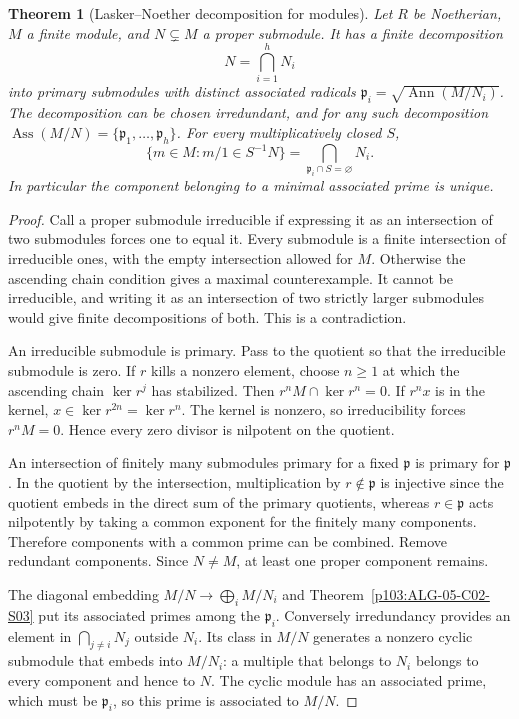\documentclass[11pt,oneside,openany]{book}
\newtheorem{theorem}{Theorem}[chapter]
\theoremstyle{definition}
\theoremstyle{remark}
\begin{document}
\begin{theorem}[Lasker--Noether decomposition for modules]\label{p103:ALG-05-C02-S02}
Let \(R\) be Noetherian, \(M\) a finite module, and \(N\subsetneq M\) a proper submodule. It has a finite decomposition
\[
 N=\bigcap_{i=1}^h N_i
\]
into primary submodules with distinct associated radicals \(\mathfrak p_i=\sqrt{\operatorname{Ann}(M/N_i)}\). The decomposition can be chosen irredundant, and for any such decomposition
\(\operatorname{Ass}(M/N)=\{\mathfrak p_1,\ldots,\mathfrak p_h\}\).
For every multiplicatively closed \(S\),
\[
 \{m\in M:m/1\in S^{-1}N\}
   =\bigcap_{\mathfrak p_i\cap S=\varnothing}N_i.
\]
In particular the component belonging to a minimal associated prime is unique.
\end{theorem}
\begin{proof}
Call a proper submodule irreducible if expressing it as an intersection of two submodules forces one to equal it. Every submodule is a finite intersection of irreducible ones, with the empty intersection allowed for \(M\). Otherwise the ascending chain condition gives a maximal counterexample. It cannot be irreducible, and writing it as an intersection of two strictly larger submodules would give finite decompositions of both. This is a contradiction.

An irreducible submodule is primary. Pass to the quotient so that the irreducible submodule is zero. If \(r\) kills a nonzero element, choose \(n\ge1\) at which the ascending chain \(\ker r^j\) has stabilized. Then \(r^nM\cap\ker r^n=0\). If \(r^nx\) is in the kernel, \(x\in\ker r^{2n}=\ker r^n\). The kernel is nonzero, so irreducibility forces \(r^nM=0\). Hence every zero divisor is nilpotent on the quotient.

An intersection of finitely many submodules primary for a fixed \(\mathfrak p\) is primary for \(\mathfrak p\). In the quotient by the intersection, multiplication by \(r\notin\mathfrak p\) is injective since the quotient embeds in the direct sum of the primary quotients, whereas \(r\in\mathfrak p\) acts nilpotently by taking a common exponent for the finitely many components. Therefore components with a common prime can be combined. Remove redundant components. Since \(N\ne M\), at least one proper component remains.

The diagonal embedding \(M/N\to\bigoplus_i M/N_i\) and Theorem~\ref{p103:ALG-05-C02-S03} put its associated primes among the \(\mathfrak p_i\). Conversely irredundancy provides an element in \(\bigcap_{j\ne i}N_j\) outside \(N_i\). Its class in \(M/N\) generates a nonzero cyclic submodule that embeds into \(M/N_i\): a multiple that belongs to \(N_i\) belongs to every component and hence to \(N\). The cyclic module has an associated prime, which must be \(\mathfrak p_i\), so this prime is associated to \(M/N\).


\end{proof}
\end{document}
